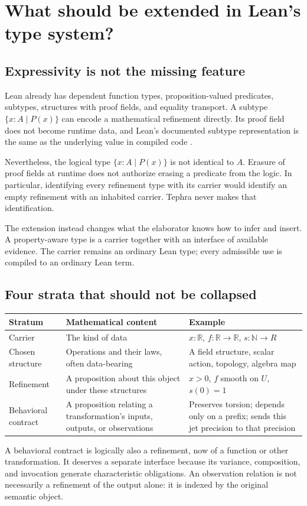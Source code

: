 \documentclass[11pt,a4paper]{article}
\newcommand{\N}{\mathbb N}
\newcommand{\R}{\mathbb R}
\theoremstyle{plain}
\theoremstyle{definition}
\begin{document}
\section{What should be extended in Lean's type system?}\label{sec:types}

\subsection{Expressivity is not the missing feature}
Lean already has dependent function types, proposition-valued predicates, subtypes, structures with proof fields, and equality transport. A subtype $\{x:A\mid P(x)\}$ can encode a mathematical refinement directly. Its proof field does not become runtime data, and Lean's documented subtype representation is the same as the underlying value in compiled code \cite{lean-subtype,lean-inductive}.

Nevertheless, the logical type $\{x:A\mid P(x)\}$ is not identical to $A$. Erasure of proof fields at runtime does not authorize erasing a predicate from the logic. In particular, identifying every refinement type with its carrier would identify an empty refinement with an inhabited carrier. Tephra never makes that identification.

The extension instead changes what the elaborator knows how to infer and insert. A property-aware type is a carrier together with an interface of available evidence. The carrier remains an ordinary Lean type; every admissible use is compiled to an ordinary Lean term.

\subsection{Four strata that should not be collapsed}
\begin{center}\small
\begin{tabularx}{\textwidth}{@{}L{26mm}Y Y@{}}
\toprule
Stratum & Mathematical content & Example\\
\midrule
Carrier & The kind of data & $x:\R$, $f:\R\to\R$, $s:\N\to R$\\
Chosen structure & Operations and their laws, often data-bearing & A field structure, scalar action, topology, algebra map\\
Refinement & A proposition about this object under these structures & $x>0$, $f$ smooth on $U$, $s(0)=1$\\
Behavioral contract & A proposition relating a transformation's inputs, outputs, or observations & Preserves torsion; depends only on a prefix; sends this jet precision to that precision\\
\bottomrule
\end{tabularx}
\end{center}
A behavioral contract is logically also a refinement, now of a function or other transformation. It deserves a separate interface because its variance, composition, and invocation generate characteristic obligations. An observation relation is not necessarily a refinement of the output alone: it is indexed by the original semantic object.
\end{document}
